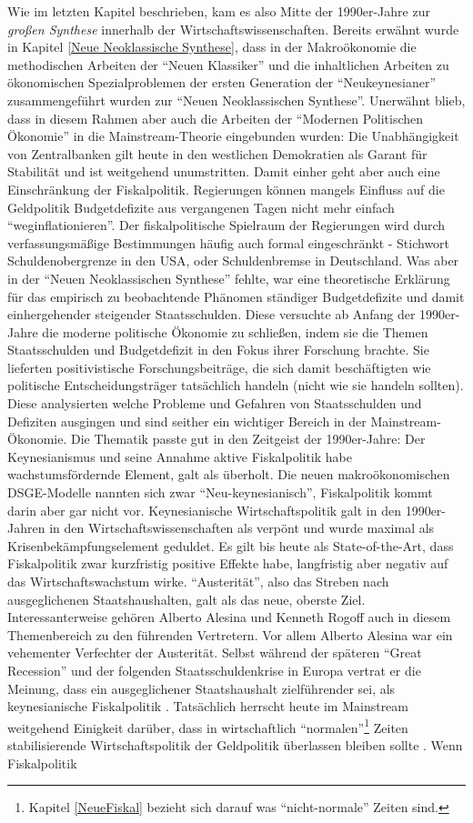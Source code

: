 Wie im letzten Kapitel beschrieben, kam es also Mitte der 1990er-Jahre zur \textit{großen Synthese} innerhalb der Wirtschaftswissenschaften. Bereits erwähnt wurde in Kapitel \ref{Neue Neoklassische Synthese}, dass in der Makroökonomie die methodischen Arbeiten der "`Neuen Klassiker"' und die inhaltlichen Arbeiten zu ökonomischen Spezialproblemen der ersten Generation der "`Neukeynesianer"' zusammengeführt wurden zur "`Neuen Neoklassischen Synthese"'. Unerwähnt blieb, dass in diesem Rahmen aber auch die Arbeiten der "`Modernen Politischen Ökonomie"' in die Mainstream-Theorie eingebunden wurden: Die Unabhängigkeit von Zentralbanken gilt heute in den westlichen Demokratien als Garant für Stabilität und ist weitgehend unumstritten. Damit einher geht aber auch eine Einschränkung der Fiskalpolitik. Regierungen können mangels Einfluss auf die Geldpolitik Budgetdefizite aus vergangenen Tagen nicht mehr einfach "`weginflationieren"'. Der fiskalpolitische Spielraum der Regierungen wird durch verfassungsmäßige Bestimmungen häufig auch formal eingeschränkt - Stichwort Schuldenobergrenze in den USA, oder Schuldenbremse in Deutschland. Was aber in der "`Neuen Neoklassischen Synthese"' fehlte, war eine theoretische Erklärung für das empirisch zu beobachtende Phänomen ständiger Budgetdefizite und damit einhergehender steigender Staatsschulden. Diese versuchte ab Anfang der 1990er-Jahre die moderne politische Ökonomie zu schließen, indem sie die Themen Staatsschulden und Budgetdefizit in den Fokus ihrer Forschung brachte. Sie lieferten positivistische Forschungsbeiträge, die sich damit beschäftigten wie politische Entscheidungsträger tatsächlich handeln (nicht wie sie handeln sollten). Diese analysierten welche Probleme und Gefahren von Staatsschulden und Defiziten ausgingen und sind seither ein wichtiger Bereich in der Mainstream-Ökonomie. Die Thematik passte gut in den Zeitgeist der 1990er-Jahre: Der Keynesianismus und seine Annahme aktive Fiskalpolitik habe wachstumsfördernde Element, galt als überholt. Die neuen makroökonomischen DSGE-Modelle nannten sich zwar "`Neu-keynesianisch"', Fiskalpolitik kommt darin aber gar nicht vor. Keynesianische Wirtschaftspolitik galt in den 1990er-Jahren in den Wirtschaftswissenschaften als verpönt und wurde maximal als Krisenbekämpfungselement geduldet. Es gilt bis heute als State-of-the-Art, dass Fiskalpolitik zwar kurzfristig positive Effekte habe, langfristig aber negativ auf das Wirtschaftswachstum wirke. "`Austerität"', also das Streben nach ausgeglichenen Staatshaushalten, galt als das neue, oberste Ziel. Interessanterweise gehören Alberto Alesina und Kenneth Rogoff auch in diesem Themenbereich zu den führenden Vertretern. Vor allem Alberto Alesina war ein vehementer Verfechter der Austerität. Selbst während der späteren "`Great Recession"' und der folgenden Staatsschuldenkrise in Europa vertrat er die Meinung, dass ein ausgeglichener Staatshaushalt zielführender sei, als keynesianische Fiskalpolitik \parencite{Alesina2019}. Tatsächlich herrscht heute im Mainstream weitgehend Einigkeit darüber, dass in wirtschaftlich "`normalen"'\footnote{Kapitel \ref{NeueFiskal} bezieht sich darauf was "`nicht-normale"' Zeiten sind.} Zeiten stabilisierende Wirtschaftspolitik der Geldpolitik überlassen bleiben sollte \textcite[S. 660]{Romer2019}. Wenn Fiskalpolitik 
